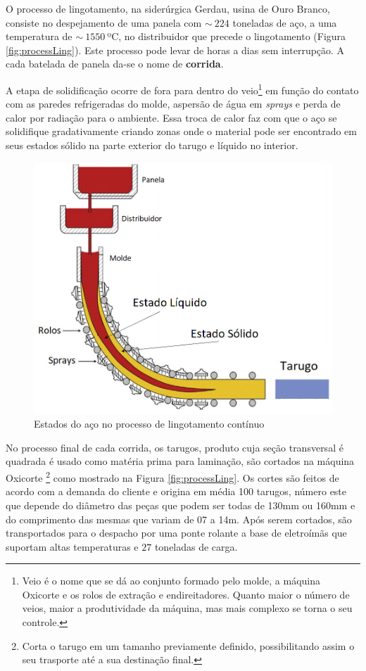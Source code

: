 O processo de lingotamento, na siderúrgica Gerdau, usina de Ouro Branco, consiste no despejamento de uma panela com $\sim~224$ toneladas de aço, a uma temperatura de $\sim~1550~$ºC, no distribuidor que precede o lingotamento (Figura \ref{fig:processLing}).
%
Este processo pode levar de horas a dias sem interrupção.
%
A cada batelada de panela da-se o nome de \textbf{corrida}.


A etapa de solidificação ocorre de fora para dentro do veio\footnote{Veio é o nome que se dá ao conjunto formado pelo molde, a máquina Oxicorte e os rolos de extração e endireitadores. Quanto maior o número de veios, maior a produtividade da máquina, mas mais complexo se torna o seu controle.} em função do contato com as paredes refrigeradas do molde, aspersão de água em \textit{sprays} e perda de calor por radiação para o ambiente. Essa troca de calor faz com que o aço se solidifique gradativamente criando zonas onde o material pode ser encontrado em seus estados sólido na parte exterior do tarugo e líquido no interior.

\begin{figure}[htbp]
	\centering
	\includegraphics[width=0.8\linewidth]{figuras/Steel/estadoSolidoLiq.png}
	\caption{Estados do aço no processo de lingotamento contínuo}
	\label{fig:processLingSolid}
\end{figure}

No processo final de cada corrida, os tarugos, produto cuja seção transversal é quadrada é usado como matéria prima para laminação,  são cortados na máquina Oxicorte \footnote{Corta o tarugo em um tamanho previamente definido, possibilitando assim o seu trasporte até a sua destinação final.} como mostrado na Figura \ref{fig:processLing}. Os cortes são feitos de acordo com a demanda do cliente e origina em média 100 tarugos, número este que depende do diâmetro das peças que podem ser todas de 130mm ou 160mm e do comprimento das mesmas que variam de 07 a 14m. Após serem cortados, são transportados para o despacho por uma ponte rolante a base de eletroímãs que suportam altas temperaturas e $27$ toneladas de carga. 



